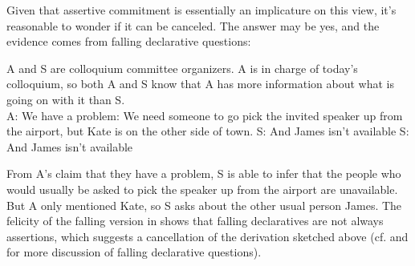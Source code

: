 \documentclass[output=paper,colorlinks,citecolor=brown]{langscibook}
\begin{document}
	Given that assertive commitment is essentially an implicature on this view, it's reasonable to wonder if it can be canceled. The answer may be yes, and the evidence comes from falling declarative questions: 
	
	\exa A and S are colloquium committee organizers. A is in charge of today's colloquium, so both A and S know that A has more information about what is going on with it than S.\\
	A: We have a problem: We need someone to go pick the invited speaker up from the airport, but Kate is on the other side of town.\label{pickle}
	\ea S: And James isn't available\fall \label{pickleF}
	\ex S: And James isn't available\rise \label{pickleR}
	\z
	\z
	
	From A's claim that they have a problem, S is able to infer that the people who would usually be asked to pick the speaker up from the airport are unavailable. But A only mentioned Kate, so S asks about the other usual person James. The felicity of the falling version in  shows that falling declaratives are not always assertions, which suggests a cancellation of the derivation sketched above (cf. \citealt[243]{bartels99} and \citealt{gunlogson08} for more discussion of falling declarative questions). 
	
\end{document}
